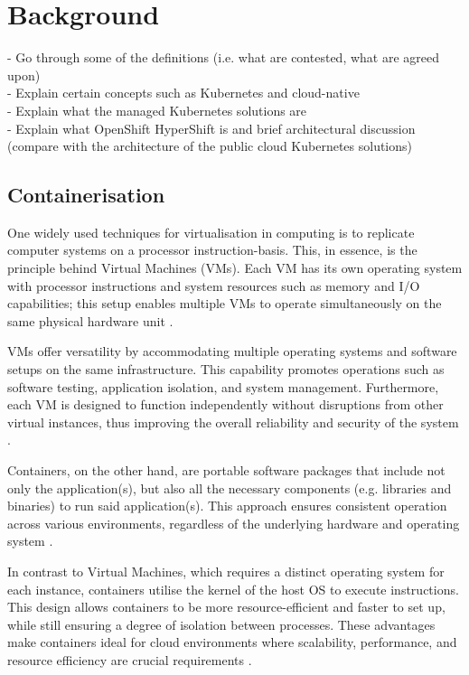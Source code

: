\chapter{Background}

- Go through some of the definitions (i.e. what are contested, what are agreed upon)\\
- Explain certain concepts such as Kubernetes and cloud-native\\
- Explain what the managed Kubernetes solutions are\\
- Explain what OpenShift HyperShift is and brief architectural discussion (compare with the architecture of the public cloud Kubernetes solutions)\\


\section{Containerisation}

One widely used techniques for virtualisation in computing is to replicate computer systems on a processor instruction-basis. This, in essence, is the principle behind Virtual Machines (VMs). Each VM has its own operating system with processor instructions and system resources such as memory and I/O capabilities; this setup enables multiple VMs to operate simultaneously on the same physical hardware unit \cite{goldberg_survey_1974}.

VMs offer versatility by accommodating multiple operating systems and software setups on the same infrastructure. This capability promotes operations such as software testing, application isolation, and system management. Furthermore, each VM is designed to function independently without disruptions from other virtual instances, thus improving the overall reliability and security of the system \cite{goldberg_survey_1974}.

Containers, on the other hand, are portable software packages that include not only the application(s), but also all the necessary components (e.g. libraries and binaries) to run said application(s). This approach ensures consistent operation across various environments, regardless of the underlying hardware and operating system \cite{bernstein_containers_2014}.

In contrast to Virtual Machines, which requires a distinct operating system for each instance, containers utilise the kernel of the host OS to execute instructions. This design allows containers to be more resource-efficient and faster to set up, while still ensuring a degree of isolation between processes. These advantages make containers ideal for cloud environments where scalability, performance, and resource efficiency are crucial requirements \cite{bernstein_containers_2014, felter_updated_2015}.

